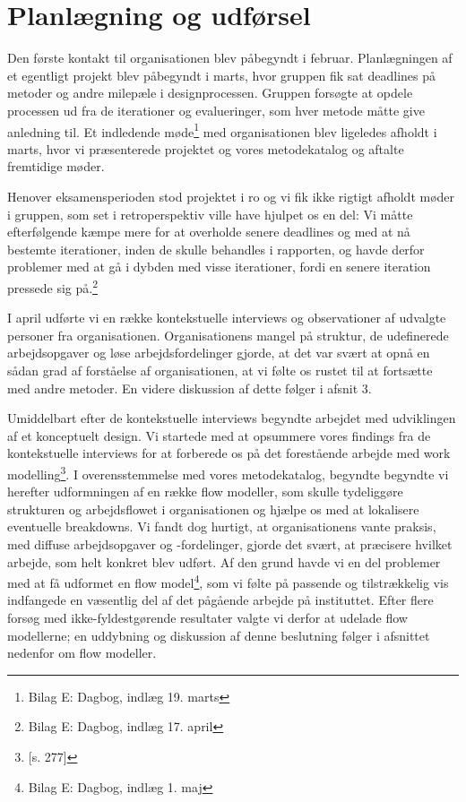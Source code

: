 \section{Planlægning og udførsel}
Den første kontakt til organisationen blev påbegyndt i februar. Planlægningen af et egentligt projekt blev påbegyndt i marts, hvor gruppen fik sat deadlines på metoder og andre milepæle i designprocessen. Gruppen forsøgte at opdele processen ud fra de iterationer og evalueringer, som hver metode måtte give anledning til. Et indledende møde\footnote{Bilag E: Dagbog, indlæg 19. marts} med organisationen blev ligeledes afholdt i marts, hvor vi præsenterede projektet og vores metodekatalog og aftalte fremtidige møder.

Henover eksamensperioden stod projektet i ro og vi fik ikke rigtigt afholdt møder i gruppen, som set i retroperspektiv ville have hjulpet os en del: Vi måtte efterfølgende kæmpe mere for at overholde senere deadlines og med at nå bestemte iterationer, inden de skulle behandles i rapporten, og havde derfor problemer med at gå i dybden med visse iterationer, fordi en senere iteration pressede sig på.\footnote{Bilag E: Dagbog, indlæg 17. april}

I april udførte vi en række kontekstuelle interviews og observationer af udvalgte personer fra organisationen. Organisationens mangel på struktur, de udefinerede arbejdsopgaver og  løse arbejdsfordelinger gjorde, at det var svært at opnå en sådan grad af forståelse af organisationen, at vi følte os rustet til at fortsætte med andre metoder. En videre diskussion af dette følger i afsnit 3.

Umiddelbart efter de kontekstuelle interviews begyndte arbejdet med udviklingen af et konceptuelt design. Vi startede med at opsummere vores findings fra de kontekstuelle interviews for at forberede os på det forestående arbejde med work modelling\footnote{\citep{Benyon}[s. 277]}.
I overensstemmelse med vores metodekatalog, begyndte begyndte vi herefter udformningen af en række flow modeller, som skulle tydeliggøre strukturen og arbejdsflowet i organisationen og hjælpe os med at lokalisere eventuelle breakdowns. 
Vi fandt dog hurtigt, at organisationens vante praksis, med diffuse arbejdsopgaver og -fordelinger, gjorde det svært, at præcisere hvilket arbejde, som helt konkret blev udført. Af den grund havde vi en del problemer med at få udformet en flow model\footnote{Bilag E: Dagbog, indlæg 1. maj}, som vi følte på passende og tilstrækkelig vis indfangede en væsentlig del af det pågående arbejde på instituttet. Efter flere forsøg med ikke-fyldestgørende resultater valgte vi derfor at udelade flow modellerne; en uddybning og diskussion af denne beslutning følger i afsnittet nedenfor om flow modeller.

